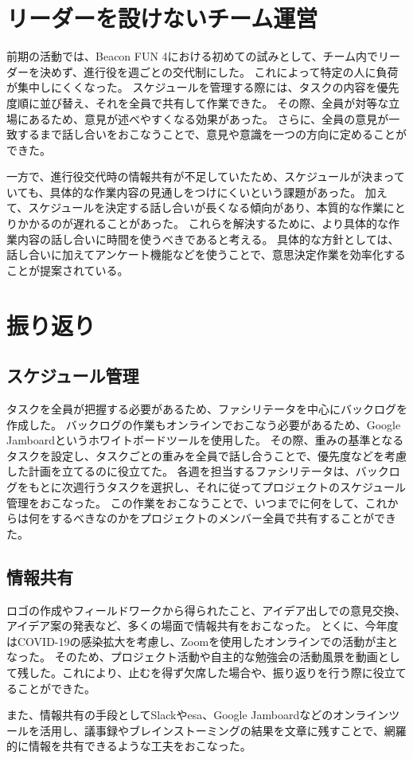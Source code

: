 \section{リーダーを設けないチーム運営}
前期の活動では、Beacon FUN 4における初めての試みとして、チーム内でリーダーを決めず、進行役を週ごとの交代制にした。
これによって特定の人に負荷が集中しにくくなった。
スケジュールを管理する際には、タスクの内容を優先度順に並び替え、それを全員で共有して作業できた。
その際、全員が対等な立場にあるため、意見が述べやすくなる効果があった。
さらに、全員の意見が一致するまで話し合いをおこなうことで、意見や意識を一つの方向に定めることができた。

一方で、進行役交代時の情報共有が不足していたため、スケジュールが決まっていても、具体的な作業内容の見通しをつけにくいという課題があった。
加えて、スケジュールを決定する話し合いが長くなる傾向があり、本質的な作業にとりかかるのが遅れることがあった。
これらを解決するために、より具体的な作業内容の話し合いに時間を使うべきであると考える。
具体的な方針としては、話し合いに加えてアンケート機能などを使うことで、意思決定作業を効率化することが提案されている。

\section{振り返り}
\subsection{スケジュール管理}
タスクを全員が把握する必要があるため、ファシリテータを中心にバックログを作成した。
バックログの作業もオンラインでおこなう必要があるため、Google Jamboardというホワイトボードツールを使用した。
その際、重みの基準となるタスクを設定し、タスクごとの重みを全員で話し合うことで、優先度などを考慮した計画を立てるのに役立てた。
各週を担当するファシリテータは、バックログをもとに次週行うタスクを選択し、それに従ってプロジェクトのスケジュール管理をおこなった。
この作業をおこなうことで、いつまでに何をして、これからは何をするべきなのかをプロジェクトのメンバー全員で共有することができた。

\subsection{情報共有}
ロゴの作成やフィールドワークから得られたこと、アイデア出しでの意見交換、アイデア案の発表など、多くの場面で情報共有をおこなった。
とくに、今年度はCOVID-19の感染拡大を考慮し、Zoomを使用したオンラインでの活動が主となった。
そのため、プロジェクト活動や自主的な勉強会の活動風景を動画として残した。これにより、止むを得ず欠席した場合や、振り返りを行う際に役立てることができた。

また、情報共有の手段としてSlackやesa、Google Jamboardなどのオンラインツールを活用し、議事録やブレインストーミングの結果を文章に残すことで、網羅的に情報を共有できるような工夫をおこなった。
